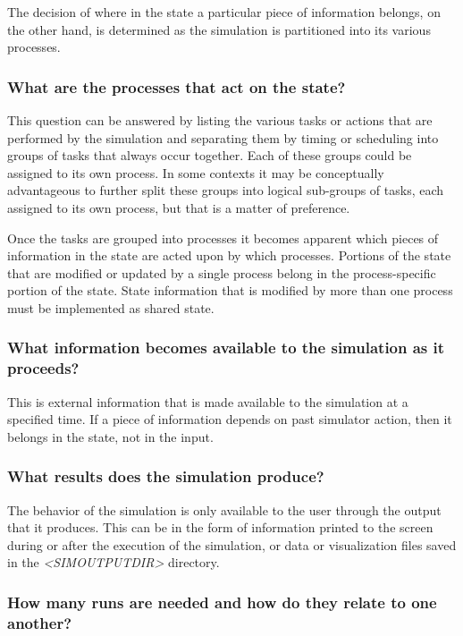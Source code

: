\documentclass[12pt]{article}
\newcommand{\simoutputdir}[1]{\textsf{\textsl{{\relsize{-1.0}\textless{}\mbox{SIMOUTPUTDIR}\textgreater{}}}}\code{{#1}}}
\newcommand{\code}[1]{{\relsize{-0.5}{\tt{{#1}}}}}  %
\numberwithin{equation}{section}
\numberwithin{table}{section}
\numberwithin{figure}{section}
\begin{document}
The decision of where in the state a particular piece of information belongs, on the other hand, is determined as the simulation is partitioned into its various processes.

\subsubsection{What are the processes that act on the state?}

This question can be answered by listing the various tasks or actions that are performed by the simulation and separating them by timing or scheduling into groups of tasks that always occur together. Each of these groups could be assigned to its own process. In some contexts it may be conceptually advantageous to further split these groups into logical sub-groups of tasks, each assigned to its own process, but that is a matter of preference.

Once the tasks are grouped into processes it becomes apparent which pieces of information in the state are acted upon by which processes. Portions of the state that are modified or updated by a single process belong in the process-specific portion of the state. State information that is modified by more than one process must be implemented as shared state.

\subsubsection{What information becomes available to the simulation as it proceeds?}

This is external information that is made available to the simulation at a specified time. If a piece of information depends on past simulator action, then it belongs in the state, not in the input.

\subsubsection{What results does the simulation produce?}

The behavior of the simulation is only available to the user through the output that it produces. This can be in the form of information printed to the screen during or after the execution of the simulation, or data or visualization files saved in the \simoutputdir{} directory.

\subsubsection{How many runs are needed and how do they relate to one another?}
\end{document}
